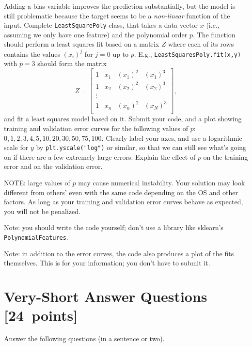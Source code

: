 \documentclass{article}
\newcommand{\blu}[1]{{\textcolor{blu}{#1}}}
\let\ask\blu
\newcommand\pts[1]{\textcolor{pointscolour}{[#1~points]}}
\begin{document}
Adding a bias variable improves the prediction substantially, but the model is still problematic because the target seems to be a \emph{non-linear} function of the input.
Complete \texttt{LeastSquarePoly} class, that takes a data vector $x$ (i.e., assuming we only have one feature) and the polynomial order $p$. The function should perform a least squares fit based on a matrix $Z$ where each of its rows contains the values $(x_{i})^j$ for $j=0$ up to $p$. E.g., \texttt{LeastSquaresPoly.fit(x,y)}  with $p = 3$ should form the matrix
\[
Z =
\left[\begin{array}{cccc}
1 & x_1 & (x_1)^2 & (x_1)^3\\
1 & x_2 & (x_2)^2 & (x_2)^3\\
\vdots\\
1 & x_n & (x_n)^2 & (x_N)^3\\
\end{array}
\right],
\]
and fit a least squares model based on it.
\ask{Submit your code, and a plot showing training and validation error curves for the following values of $p$: $0,1,2,3,4,5,10,20,30,50,75,100$. Clearly label your axes, and use a logarithmic scale for $y$} by \texttt{plt.yscale("log")} or similar, so that we can still see what's going on if there are a few extremely large errors. \ask{Explain the effect of $p$ on the training error and on the validation error.}

NOTE: large values of $p$ may cause numerical instability. Your solution may look different from others' even with the same code depending on the OS and other factors. As long as your training and validation error curves behave as expected, you will not be penalized.

Note: you should write the code yourself; don't use a library like sklearn's \texttt{PolynomialFeatures}.

Note: in addition to the error curves, the code also produces a plot of the fits themselves. This is for your information; you don't have to submit it.

%


\clearpage
\section{Very-Short Answer Questions \pts{24}}

\ask{Answer the following questions (in a sentence or two).}
\end{document}

